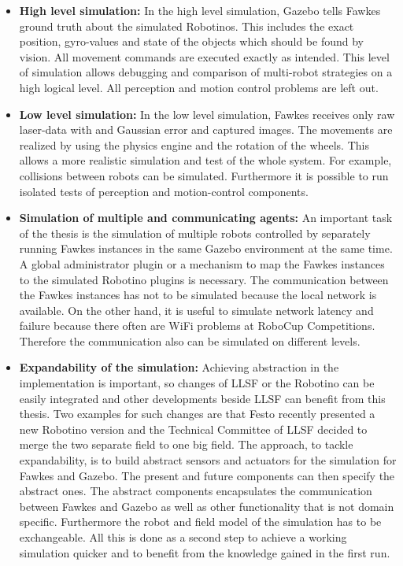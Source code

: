 \documentclass[a4paper,11pt]{article}
\begin{document}
\begin{itemize}
\item \textbf{High level simulation:} In the high level simulation, Gazebo tells Fawkes ground truth about the simulated Robotinos. This includes the exact position, gyro-values and state of the objects which should be found by vision. All movement commands are executed exactly as intended. This level of simulation allows debugging and comparison of multi-robot strategies on a high logical level. All perception and motion control problems are left out.
\item \textbf{Low level simulation:} In the low level simulation, Fawkes receives only raw laser-data with and Gaussian error and captured images. The movements are realized by using the physics engine and the rotation of the wheels. This allows a more realistic simulation and test of the whole system. For example, collisions between robots can be simulated. Furthermore it is possible to run isolated tests of perception and motion-control components.
\item \textbf{Simulation of multiple and communicating agents:} An important task of the thesis is the simulation of multiple robots controlled by separately running Fawkes instances in the same Gazebo environment at the same time. A global administrator plugin or a mechanism to map the Fawkes instances to the simulated Robotino plugins is necessary. The communication between the Fawkes instances has not to be simulated because the local network is available. On the other hand, it is useful to simulate network latency and failure because there often are WiFi problems at RoboCup Competitions. Therefore the communication also can be simulated on different levels.\\
\item \textbf{Expandability of the simulation:} Achieving abstraction in the implementation is important, so changes of LLSF or the Robotino can be easily integrated and other developments beside LLSF can benefit from this thesis. Two examples for such changes are that Festo recently presented a new Robotino version and the Technical Committee of LLSF decided to merge the two separate field to one big field. The approach, to tackle expandability, is to build abstract sensors and actuators for the simulation for Fawkes and Gazebo. The present and future components can then specify the abstract ones. The abstract components encapsulates the communication between Fawkes and Gazebo as well as other functionality that is not domain specific. Furthermore the robot and field model of the simulation has to be exchangeable. All this is done as a second step to achieve a working simulation quicker and to benefit from the knowledge gained in the first run.

\end{itemize}
\end{document}
